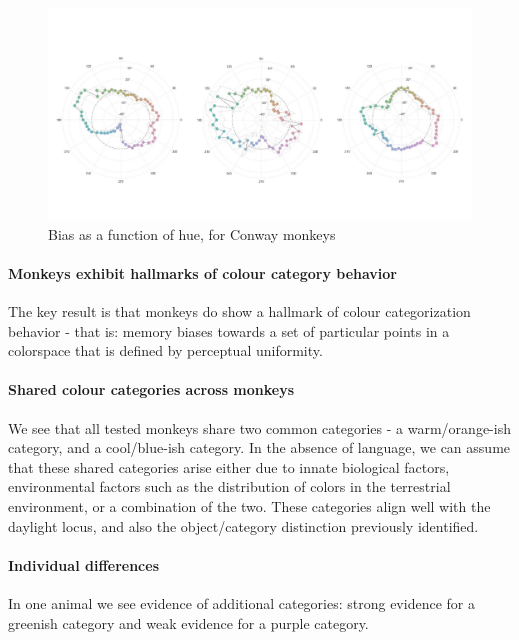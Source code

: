 

\begin{figure}
\includegraphics[width=\textwidth]{../../Figures/Old/biasfigs.pdf}
\caption{Bias as a function of hue, for Conway monkeys} 
\end{figure}
\paragraph{Monkeys exhibit hallmarks of colour category behavior}

The key result is that monkeys do show a hallmark of colour categorization behavior - that is: memory biases towards a set of particular points in a colorspace that is defined by perceptual uniformity. 


\paragraph{Shared colour categories across monkeys}

We see that all tested monkeys share two common categories - a warm/orange-ish category, and a cool/blue-ish category.
In the absence of language, we can assume that these shared categories arise either due to innate biological factors, environmental factors such as the distribution of colors in the terrestrial environment, or a combination of the two.
These categories align well with the daylight locus, and also the object/category distinction previously identified.

\paragraph{Individual differences}

In one animal we see evidence of additional categories: strong evidence for a greenish category and weak evidence for a purple category.


